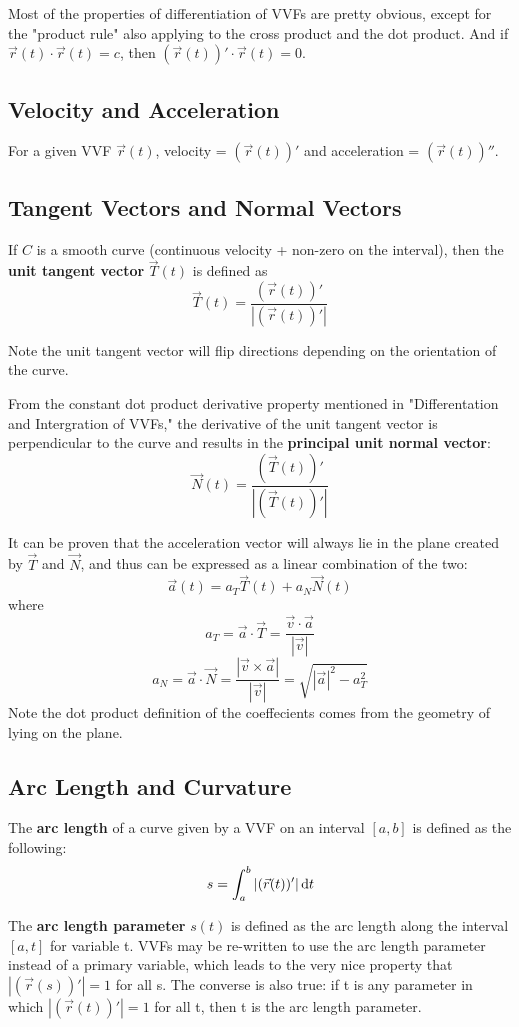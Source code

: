 \documentclass{article}
\begin{document}
Most of the properties of differentiation of VVFs are pretty obvious, except for the "product rule" also applying to the cross product and the dot product.
And if $\vec{r}(t) \cdot \vec{r}(t) = c$, then $(\vec{r}(t))' \cdot \vec{r}(t) = 0$.

\subsection{Velocity and Acceleration}
For a given VVF $\vec{r}(t)$, velocity = $(\vec{r}(t))'$ and acceleration = $(\vec{r}(t))''$.

\subsection{Tangent Vectors and Normal Vectors}
If $C$ is a smooth curve (continuous velocity + non-zero on the interval), then the \textbf{unit tangent vector} $\vec{T}(t)$ is defined as 
\[\vec{T}(t) = \frac{(\vec{r}(t))'}{|(\vec{r}(t))'|}\]

Note the unit tangent vector will flip directions depending on the orientation of the curve.

From the constant dot product derivative property mentioned in "Differentation and Intergration of VVFs," the derivative of the unit tangent vector is perpendicular to the curve and results in the \textbf{principal unit normal vector}:
\[\vec{N}(t) = \frac{(\vec{T}(t))'}{|(\vec{T}(t))'|}\]

It can be proven that the acceleration vector will always lie in the plane created by $\vec{T}$ and $\vec{N}$, and thus can be expressed as a linear combination of the two:
\[\vec{a}(t) = a_T \vec{T}(t) + a_N \vec{N}(t)\]
where
\[a_T = \vec{a} \cdot \vec{T} = \frac{\vec{v} \cdot \vec{a}}{|\vec{v}|}\]
\[a_N = \vec{a} \cdot \vec{N} = \frac{|\vec{v} \times \vec{a}|}{|\vec{v}|} = \sqrt{|\vec{a}|^2 - a_T^2}\]
Note the dot product definition of the coeffecients comes from the geometry of lying on the plane.


\subsection{Arc Length and Curvature}
The \textbf{arc length} of a curve given by a VVF on an interval $[a, b]$ is defined as the following:
\[s = \int_{a}^{b} |(\vec{r}(t))'| \odif{t}\]

The \textbf{arc length parameter} $s(t)$ is defined as the arc length along the interval $[a, t]$ for variable t.
VVFs may be re-written to use the arc length parameter instead of a primary variable, which leads to the very nice property that $|(\vec{r}(s))'| = 1$ for all s.
The converse is also true: if t is any parameter in which $|(\vec{r}(t))'| = 1$ for all t, then t is the arc length parameter.
\end{document}
